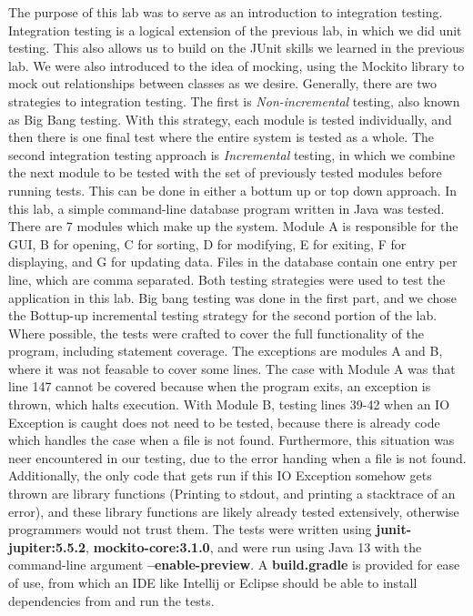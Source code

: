 The purpose of this lab was to serve as an introduction to integration testing.
Integration testing is a logical extension of the previous lab, in which we did
unit testing. This also allows us to build on the JUnit skills we learned in
the previous lab. We were also introduced to the idea of mocking, using the
Mockito library to mock out relationships between classes as we desire.
Generally, there are two strategies to integration testing. The first is
\textit{Non-incremental} testing, also known as Big Bang testing. With this
strategy, each module is tested individually, and then there is one final test
where the entire system is tested as a whole. The second integration testing
approach is \textit{Incremental} testing, in which we combine the next module
to be tested with the set of previously tested modules before running tests.
This can be done in either a bottum up or top down approach. In this lab, a
simple command-line database program written in Java was tested. There are 7
modules which make up the system.  Module A is responsible for the GUI, B for
opening, C for sorting, D for modifying, E for exiting, F for displaying, and G
for updating data. Files in the database contain one entry per line, which are
comma separated. Both testing strategies were used to test the application in
this lab. Big bang testing was done in the first part, and we chose the
Bottup-up incremental testing strategy for the second portion of the lab. Where
possible, the tests were crafted to cover the full functionality of the
program, including statement coverage. The exceptions are modules A and B,
where it was not feasable to cover some lines.  The case with Module A was that
line 147 cannot be covered because when the program exits, an exception is
thrown, which halts execution. With Module B, testing lines 39-42 when an IO
Exception is caught does not need to be tested, because there is already code
which handles the case when a file is not found.  Furthermore, this situation
was neer encountered in our testing, due to the error handing when a file is
not found. Additionally, the only code that gets run if this IO Exception
somehow gets thrown are library functions (Printing to stdout, and printing a
stacktrace of an error), and these library functions are likely already tested
extensively, otherwise programmers would not trust them.  The tests were
written using \textbf{junit-jupiter:5.5.2}, \textbf{mockito-core:3.1.0}, and
were run using Java 13 with the command-line argument
\textbf{--enable-preview}. A \textbf{build.gradle} is provided for ease of use,
from which an IDE like Intellij or Eclipse should be able to install
dependencies from and run the tests.
